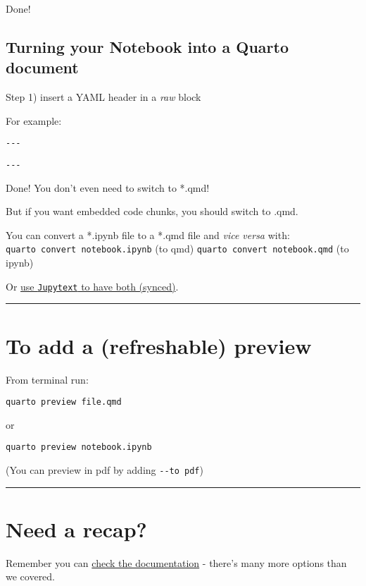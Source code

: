 \documentclass[
  letterpaper,
  DIV=11,
  numbers=noendperiod]{scrartcl}
\begin{document}
Done!

\hypertarget{turning-your-notebook-into-a-quarto-document}{%
\subsection{Turning your Notebook into a Quarto
document}\label{turning-your-notebook-into-a-quarto-document}}

Step 1) insert a YAML header in a \emph{raw} block

For example:

\texttt{-\/-\/-}

\texttt{-\/-\/-}

Done! You don't even need to switch to *.qmd!

But if you want embedded code chunks, you should switch to .qmd.

You can convert a *.ipynb file to a *.qmd file and \emph{vice versa}
with: \texttt{quarto\ convert\ notebook.ipynb} (to qmd)
\texttt{quarto\ convert\ notebook.qmd} (to ipynb)

Or \href{https://jupytext.readthedocs.io/en/latest/}{use
\texttt{Jupytext} to have both (synced)}.

\begin{center}\rule{0.5\linewidth}{0.5pt}\end{center}

\hypertarget{to-add-a-refreshable-preview}{%
\section{To add a (refreshable)
preview}\label{to-add-a-refreshable-preview}}

From terminal run:

\texttt{quarto\ preview\ file.qmd}

or

\texttt{quarto\ preview\ notebook.ipynb}

(You can preview in pdf by adding \texttt{-\/-to\ pdf})

\begin{center}\rule{0.5\linewidth}{0.5pt}\end{center}

\hypertarget{need-a-recap}{%
\section{Need a recap?}\label{need-a-recap}}

Remember you can
\href{https://quarto.org/docs/authoring/markdown-basics.html}{check the
documentation} - there's many more options than we covered.
\end{document}
